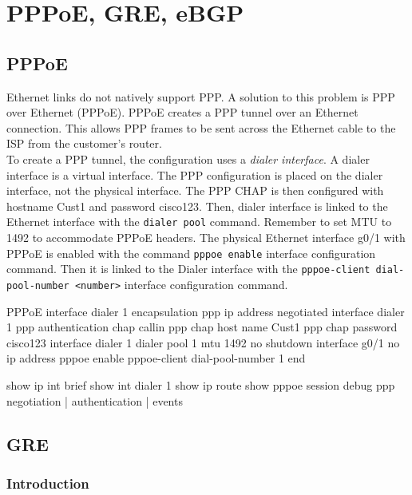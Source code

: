 \chapter{PPPoE, GRE, eBGP}

\section{PPPoE}

Ethernet links do not natively support PPP. A solution to this problem is PPP over Ethernet (PPPoE). PPPoE creates a PPP tunnel over an Ethernet connection. This allows PPP frames to be sent across the Ethernet cable to the ISP from the customer’s router.\\

To create a PPP tunnel, the configuration uses a \emph{dialer interface}. A dialer interface is a virtual interface. The PPP configuration is placed on the dialer interface, not the physical interface. The PPP CHAP is then configured with hostname Cust1 and password cisco123. Then, dialer interface is linked to the Ethernet interface with the \verb|dialer pool| command. Remember to set MTU to 1492 to accommodate PPPoE headers. The physical Ethernet interface g0/1 with PPPoE is enabled with the command \verb|pppoe enable| interface configuration command. Then it is linked to the Dialer interface with the \verb|pppoe-client dial-pool-number <number>| interface configuration command.


\begin{sexylisting}{PPPoE}
interface dialer 1
  encapsulation ppp
  ip address negotiated
interface dialer 1
  ppp authentication chap callin
  ppp chap host name Cust1
  ppp chap password cisco123  
interface dialer 1
  dialer pool 1
  mtu 1492
  no shutdown  
interface g0/1
  no ip address
  pppoe enable
  pppoe-client dial-pool-number 1
end

show ip int brief
show int dialer 1
show ip route
show pppoe session
debug ppp {negotiation | authentication | events}  
\end{sexylisting}

\section{GRE}

\subsection{Introduction}

